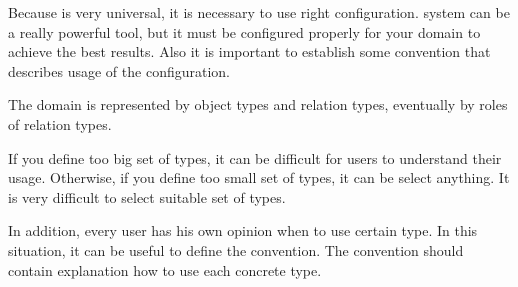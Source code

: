 
Because \textan{} is very universal, it is necessary to use right configuration.
\textan{} system can be a really powerful tool, but it must be configured properly
for your domain to achieve the best results. Also it is important to establish
some convention that describes usage of the configuration.

The domain is represented by object types and relation types, eventually by roles
of relation types. 

If you define too big set of types, it can be difficult for users to understand
their usage. Otherwise, if you define too small set of types, it can be select
anything. It is very difficult to select suitable set of types.

In addition, every user has his own opinion when to use certain type. In this
situation, it can be useful to define the convention. The convention should contain
explanation how to use each concrete type.
